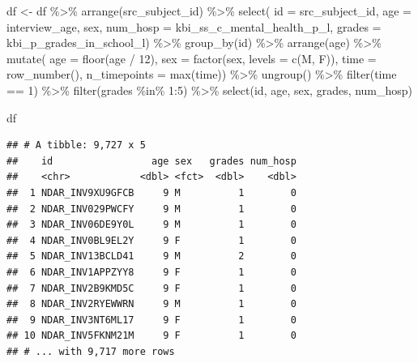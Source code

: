 \documentclass[
]{book}
\newenvironment{Shaded}{\begin{snugshade}}{\end{snugshade}}
\newcommand{\AttributeTok}[1]{\textcolor[rgb]{0.77,0.63,0.00}{#1}}
\newcommand{\DecValTok}[1]{\textcolor[rgb]{0.00,0.00,0.81}{#1}}
\newcommand{\FunctionTok}[1]{\textcolor[rgb]{0.00,0.00,0.00}{#1}}
\newcommand{\NormalTok}[1]{#1}
\newcommand{\OtherTok}[1]{\textcolor[rgb]{0.56,0.35,0.01}{#1}}
\newcommand{\SpecialCharTok}[1]{\textcolor[rgb]{0.00,0.00,0.00}{#1}}
\newcommand{\StringTok}[1]{\textcolor[rgb]{0.31,0.60,0.02}{#1}}
\begin{document}
\begin{Shaded}
\begin{Highlighting}[]
\NormalTok{df }\OtherTok{\textless{}{-}}\NormalTok{ df }\SpecialCharTok{\%\textgreater{}\%} 
  \FunctionTok{arrange}\NormalTok{(src\_subject\_id) }\SpecialCharTok{\%\textgreater{}\%} 
  \FunctionTok{select}\NormalTok{(}
    \AttributeTok{id =}\NormalTok{ src\_subject\_id, }
    \AttributeTok{age =}\NormalTok{ interview\_age,}
\NormalTok{    sex, }
    \AttributeTok{num\_hosp =}\NormalTok{ kbi\_ss\_c\_mental\_health\_p\_l,}
    \AttributeTok{grades =}\NormalTok{ kbi\_p\_grades\_in\_school\_l) }\SpecialCharTok{\%\textgreater{}\%} 
  \FunctionTok{group\_by}\NormalTok{(id) }\SpecialCharTok{\%\textgreater{}\%} 
  \FunctionTok{arrange}\NormalTok{(age) }\SpecialCharTok{\%\textgreater{}\%} 
  \FunctionTok{mutate}\NormalTok{(}
    \AttributeTok{age =} \FunctionTok{floor}\NormalTok{(age }\SpecialCharTok{/} \DecValTok{12}\NormalTok{),}
    \AttributeTok{sex =} \FunctionTok{factor}\NormalTok{(sex, }\AttributeTok{levels =} \FunctionTok{c}\NormalTok{(}\StringTok{\textquotesingle{}M\textquotesingle{}}\NormalTok{, }\StringTok{\textquotesingle{}F\textquotesingle{}}\NormalTok{)),}
    \AttributeTok{time =} \FunctionTok{row\_number}\NormalTok{(),}
    \AttributeTok{n\_timepoints =} \FunctionTok{max}\NormalTok{(time)) }\SpecialCharTok{\%\textgreater{}\%} 
  \FunctionTok{ungroup}\NormalTok{() }\SpecialCharTok{\%\textgreater{}\%} 
  \FunctionTok{filter}\NormalTok{(time }\SpecialCharTok{==} \DecValTok{1}\NormalTok{) }\SpecialCharTok{\%\textgreater{}\%}
  \FunctionTok{filter}\NormalTok{(grades }\SpecialCharTok{\%in\%} \DecValTok{1}\SpecialCharTok{:}\DecValTok{5}\NormalTok{) }\SpecialCharTok{\%\textgreater{}\%} 
  \FunctionTok{select}\NormalTok{(id, age, sex, grades, num\_hosp)}

\NormalTok{df}
\end{Highlighting}
\end{Shaded}

\begin{verbatim}
## # A tibble: 9,727 x 5
##    id                 age sex   grades num_hosp
##    <chr>            <dbl> <fct>  <dbl>    <dbl>
##  1 NDAR_INV9XU9GFCB     9 M          1        0
##  2 NDAR_INV029PWCFY     9 M          1        0
##  3 NDAR_INV06DE9Y0L     9 M          1        0
##  4 NDAR_INV0BL9EL2Y     9 F          1        0
##  5 NDAR_INV13BCLD41     9 M          2        0
##  6 NDAR_INV1APPZYY8     9 F          1        0
##  7 NDAR_INV2B9KMD5C     9 F          1        0
##  8 NDAR_INV2RYEWWRN     9 M          1        0
##  9 NDAR_INV3NT6ML17     9 F          1        0
## 10 NDAR_INV5FKNM21M     9 F          1        0
## # ... with 9,717 more rows
\end{verbatim}
\end{document}
